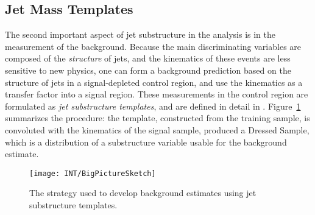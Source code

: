 \subsection{Jet Mass Templates}
	\label{chapter:search:substructure:templates}

The second important aspect of jet substructure in the analysis is in the measurement of the background. Because the main discriminating variables are composed of the \textit{structure} of jets, and the kinematics of these events are less sensitive to new physics, one can form a background prediction based on the structure of jets in a signal-depleted control region, and use the kinematics as a transfer factor into a signal region. These measurements in the control region are formulated as \textit{jet substructure templates}, and are defined in detail in \cite{MassTemplates}. Figure~\ref{fig:search:substructure:template-big-picture} summarizes the procedure: the template, constructed from the training sample, is convoluted with the kinematics of the signal sample, produced a Dressed Sample, which is a distribution of a substructure variable usable for the background estimate.


\begin{figure}
\centering
\texttt{[image: INT/BigPictureSketch]}
\label{fig:search:substructure:template-big-picture}
\caption{The strategy used to develop background estimates using jet substructure templates.}
\end{figure}


